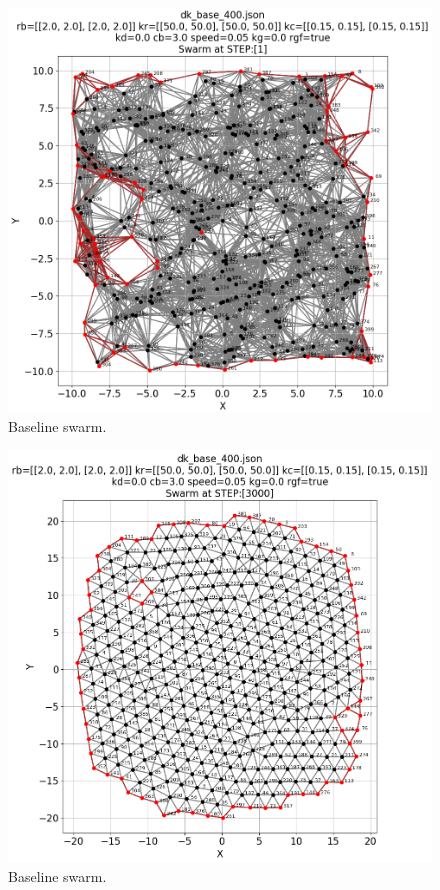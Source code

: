 \documentclass[12pt,a4paper]{IEEEtran}
\begin{document}
\begin{figure}[H]
	\begin{center}
		\includegraphics[width=1.0\linewidth]{figures/baseline1}
	\end{center}
	\caption{Baseline swarm. \label{fig:baselineSwarm1}}
\end{figure}

\begin{figure}[H]
	\begin{center}
		\includegraphics[width=1.0\linewidth]{figures/baseline2}
	\end{center}
	\caption{Baseline swarm. \label{fig:baselineSwarm2}}
\end{figure}
\end{document}
